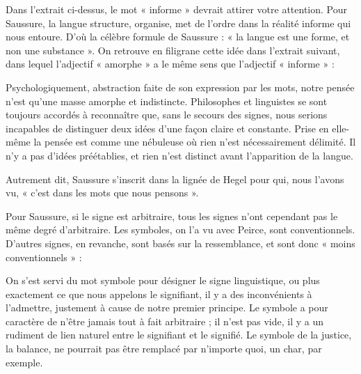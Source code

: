 Dans l’extrait ci-dessus, le mot « informe » devrait attirer votre attention. Pour Saussure, la langue structure, organise, met de l’ordre dans la réalité informe qui nous entoure. D’où la célèbre formule de Saussure : « la langue est une forme, et non une substance ». On retrouve en filigrane cette idée dans l’extrait suivant, dans lequel l’adjectif « amorphe » a le même sens que l’adjectif « informe » :
\begin{lecture}{}
Psychologiquement, abstraction faite de son expression par les mots, notre pensée n’est qu’une masse amorphe et indistincte. Philosophes et linguistes se sont toujours accordés à reconnaître que, sans le secours des signes, nous serions incapables de distinguer deux idées d’une façon claire et constante. Prise en elle-même la pensée est comme une nébuleuse où rien n’est nécessairement délimité. Il n’y a pas d’idées préétablies, et rien n’est distinct avant l’apparition de la langue.
\end{lecture}
Autrement dit, Saussure s’inscrit dans la lignée de Hegel pour qui, nous l’avons vu, « c’est dans les mots que nous pensons ».

Pour Saussure, si le signe est arbitraire, tous les signes n’ont cependant pas le même degré d’arbitraire. Les symboles, on l’a vu avec Peirce, sont conventionnels. D’autres signes, en revanche, sont basés sur la ressemblance, et sont donc « moins conventionnels » :
\begin{lecture}{}
On s’est servi du mot symbole pour désigner le signe linguistique, ou plus exactement ce que nous appelons le signifiant, il y a des inconvénients à l’admettre, justement à cause de notre premier principe. Le symbole a pour caractère de n’être jamais tout à fait arbitraire ; il n’est pas vide, il y a un rudiment de lien naturel entre le signifiant et le signifié. Le symbole de la justice, la balance, ne pourrait pas être remplacé par n’importe quoi, un char, par exemple.
\end{lecture}

